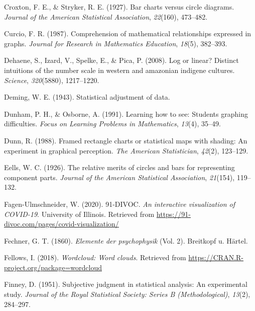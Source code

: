\documentclass[print]{nuthesis}
\newlength{\cslhangindent}
\newenvironment{CSLReferences}[2]%
{\setlength{\parindent}{0pt}%
\everypar{\setlength{\hangindent}{\cslhangindent}}\ignorespaces}%
{\par}
\begin{document}
\begin{CSLReferences}{1}{0}
\leavevmode{}%
Croxton, F. E., \& Stryker, R. E. (1927). Bar charts versus circle diagrams. \emph{Journal of the American Statistical Association}, \emph{22}(160), 473--482.

\leavevmode{}%
Curcio, F. R. (1987). Comprehension of mathematical relationships expressed in graphs. \emph{Journal for Research in Mathematics Education}, \emph{18}(5), 382--393.

\leavevmode{}%
Dehaene, S., Izard, V., Spelke, E., \& Pica, P. (2008). Log or linear? Distinct intuitions of the number scale in western and amazonian indigene cultures. \emph{Science}, \emph{320}(5880), 1217--1220.

\leavevmode{}%
Deming, W. E. (1943). Statistical adjustment of data.

\leavevmode{}%
Dunham, P. H., \& Osborne, A. (1991). Learning how to see: Students graphing difficulties. \emph{Focus on Learning Problems in Mathematics}, \emph{13}(4), 35--49.

\leavevmode{}%
Dunn, R. (1988). Framed rectangle charts or statistical maps with shading: An experiment in graphical perception. \emph{The American Statistician}, \emph{42}(2), 123--129.

\leavevmode{}%
Eells, W. C. (1926). The relative merits of circles and bars for representing component parts. \emph{Journal of the American Statistical Association}, \emph{21}(154), 119--132.

\leavevmode{}%
Fagen-Ulmschneider, W. (2020). 91-DIVOC. \emph{An interactive visualization of COVID-19}. University of Illinois. Retrieved from \url{https://91-divoc.com/pages/covid-visualization/}

\leavevmode{}%
Fechner, G. T. (1860). \emph{Elemente der psychophysik} (Vol. 2). Breitkopf u. H{ä}rtel.

\leavevmode{}%
Fellows, I. (2018). \emph{Wordcloud: Word clouds}. Retrieved from \url{https://CRAN.R-project.org/package=wordcloud}

\leavevmode{}%
Finney, D. (1951). Subjective judgment in statistical analysis: An experimental study. \emph{Journal of the Royal Statistical Society: Series B (Methodological)}, \emph{13}(2), 284--297.


\end{CSLReferences}
\end{document}
